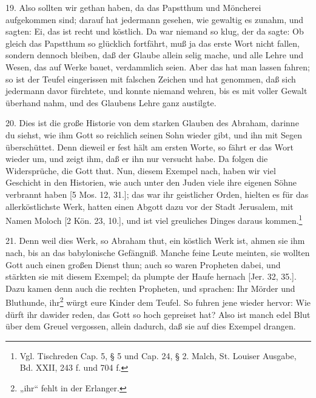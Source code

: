 19. Also sollten wir gethan haben, da das Papstthum und Möncherei aufgekommen sind; darauf hat jedermann gesehen, wie gewaltig es zunahm, und sagten: Ei, das ist recht und köstlich. Da war niemand so klug, der da sagte: Ob gleich das Papstthum so glücklich fortfährt, muß ja das erste Wort nicht fallen, sondern dennoch bleiben, daß der Glaube allein selig mache, und alle Lehre und Wesen, das auf Werke bauet, verdammlich seien. Aber das hat man lassen fahren; so ist der Teufel eingerissen mit falschen Zeichen und hat genommen, daß sich jedermann davor fürchtete, und konnte niemand wehren, bis es mit voller Gewalt überhand nahm, und des Glaubens Lehre ganz austilgte.

20. Dies ist die große Historie von dem starken Glauben des Abraham, darinne du siehst, wie ihm Gott so reichlich seinen Sohn wieder gibt, und ihn mit Segen überschüttet. Denn dieweil er fest hält am ersten Worte, so fährt er das Wort wieder um, und zeigt ihm, daß er ihn nur versucht habe. Da folgen die Widersprüche, die Gott thut. Nun, diesem Exempel nach, haben wir viel Geschicht in den Historien, wie auch unter den Juden viele ihre eigenen Söhne verbrannt haben [5 Mos. 12, 31.]; das war ihr geistlicher Orden, hielten es für das allerköstlichste Werk, hatten einen Abgott dazu vor der Stadt Jerusalem, mit Namen Moloch [2 Kön. 23, 10.], und ist viel greuliches Dinges daraus kommen.\footnote{Vgl. Tischreden Cap. 5, § 5 und Cap. 24, § 2. Malch, St. Louiser Ausgabe, Bd. XXII, 243 f. und 704 f.}

21. Denn weil dies Werk, so Abraham thut, ein köstlich Werk ist, ahmen sie ihm nach, bis an das babylonische Gefängniß. Manche feine Leute meinten, sie wollten Gott auch einen großen Dienst thun; auch so waren Propheten dabei, und stärkten sie mit diesem Exempel; da plumpte der Haufe hernach [Jer. 32, 35.]. Dazu kamen denn auch die rechten Propheten, und sprachen: Ihr Mörder und Bluthunde, ihr\footnote{„ihr“ fehlt in der Erlanger.} würgt eure Kinder dem Teufel. So fuhren jene wieder hervor: Wie dürft ihr dawider reden, das Gott so hoch gepreiset hat? Also ist manch edel Blut über dem Greuel vergossen, allein dadurch, daß sie auf dies Exempel drangen.

